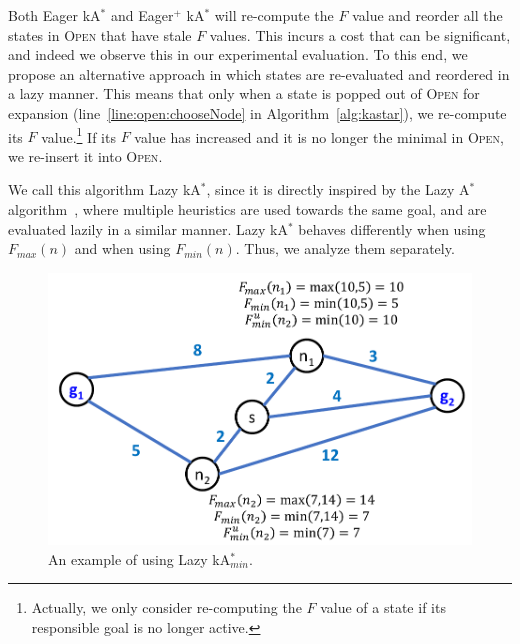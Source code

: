 \documentclass{aicom2e}
\newcommand{\astar}{A$^*$}
\newcommand{\kastar}{kA$^*$}
\newcommand{\kastarmin}{kA$^*_{min}$}
\newcommand{\minf}{$F_{min}(n)$}
\newcommand{\maxf}{$F_{max}(n)$}
\newcommand{\open}{\textsc{Open}}
\newcommand{\roni}[1]{\textbf{[RS:#1]}}
\begin{document}

Both Eager \kastar{} and Eager$^+$ \kastar{} will re-compute the $F$ value and reorder all the states in \open{} that have stale $F$ values. 
This incurs a cost that can be significant, and indeed we observe this in our experimental evaluation. To this end, we propose an alternative approach in which states are re-evaluated and reordered in a lazy manner. This means that only when a state is popped out of \open{} for expansion (line~\ref{line:open:chooseNode} in
Algorithm~\ref{alg:kastar}), we re-compute its $F$ value.\footnote{Actually, we only consider re-computing the $F$ value of a state if its responsible goal is no longer active.} If its $F$ value has
increased and it is no longer the minimal in \open, we re-insert it into
\open{}. 



We call this algorithm Lazy \kastar{}, since it is directly inspired
by the Lazy \astar{} algorithm~\cite{betzalel2015typeSystem,tolpin2013toward},
where multiple heuristics are used towards the same goal, and are evaluated
lazily in a similar manner. Lazy \kastar{} behaves differently when using
\maxf{} and when using \minf{}. Thus, we analyze them separately.





\begin{figure}
    \includegraphics[width=\columnwidth]{Lazy_cropped_cropped.pdf}
    \caption{An example of using Lazy \kastarmin{}.}
    \label{fig:lazy}
\end{figure}
\end{document}
